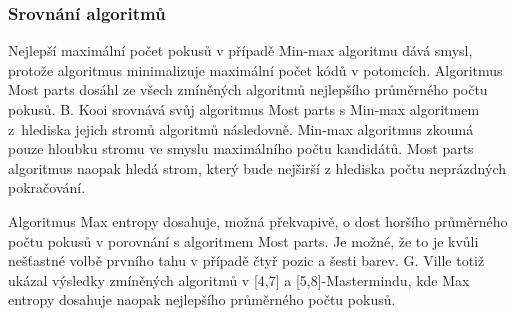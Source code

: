 


\subsubsection{Srovnání algoritmů}
Nejlepší maximální počet pokusů v případě Min-max algoritmu dává smysl, protože algoritmus minimalizuje maximální počet kódů v potomcích. Algoritmus Most parts dosáhl ze všech zmíněných algoritmů nejlepšího průměrného počtu pokusů. B. Kooi \cite{kooi} srovnává svůj algoritmus Most parts s Min-max algoritmem z~hlediska jejich stromů algoritmů následovně. Min-max algoritmus zkoumá pouze hloubku stromu ve smyslu maximálního počtu kandidátů. Most parts algoritmus naopak hledá strom, který bude nejširší z hlediska počtu neprázdných pokračování. 

Algoritmus Max entropy dosahuje, možná překvapivě, o dost horšího průměrného počtu pokusů v porovnání s algoritmem Most parts. Je možné, že to je kvůli nešťastné volbě prvního tahu v případě čtyř pozic a šesti barev. G. Ville \cite{ville2013optimalmastermind47strategy} totiž ukázal výsledky zmíněných algoritmů v [4,7] a [5,8]-Mastermindu, kde Max entropy dosahuje naopak nejlepšího průměrného počtu pokusů. 





